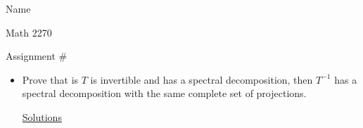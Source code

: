 \documentclass[12pt]{article}
\begin{document}
\hfill Name 

\hfill Math 2270

\hfill Assignment \#


\begin{itemize}

\item [1)] Prove that is $T$ is invertible and has a spectral decomposition, then $T^{-1}$ has a spectral decomposition with the same complete set of projections. 

\underline{Solutions}


\end{itemize}
\end{document}

